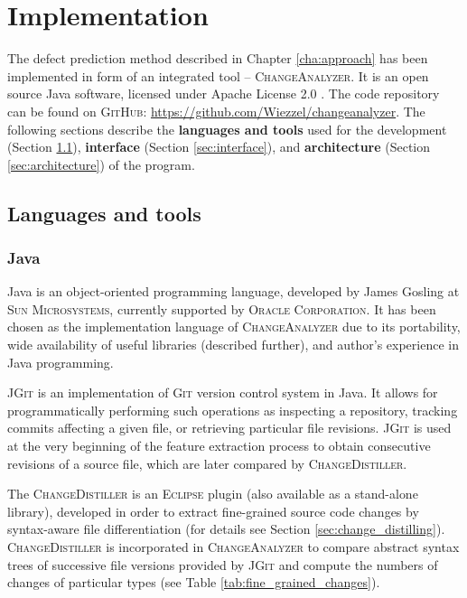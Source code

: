 \documentclass{pracamgr}
\newcommand{\ca}{\textsc{ChangeAnalyzer}\xspace}
\newenvironment{definition}[1]%
	{
		\medskip
		\begin{adjustwidth}{\parindent}{}
		\rlap{\textbf{#1}}\par\nobreak
	}
	{
		\end{adjustwidth}
	}
\begin{document}
\chapter{Implementation}
\label{cha:implementation}
The defect prediction method described in Chapter \ref{cha:approach} has been implemented in form of an integrated tool -- \ca. It is an open source Java software, licensed under Apache License 2.0 \cite{apache}. The code repository can be found on \textsc{GitHub}: \url{https://github.com/Wiezzel/changeanalyzer}. The following sections describe the \textbf{languages and tools} used for the development (Section \ref{sec:languagess}), \textbf{interface} (Section \ref{sec:interface}), and \textbf{architecture} (Section \ref{sec:architecture}) of the program.

\section{Languages and tools}
\label{sec:languagess}

\subsection{Java} 

Java \cite{java} is an object-oriented programming language, developed by James Gosling at \textsc{Sun Microsystems}, currently supported by \textsc{Oracle Corporation}. It has been chosen as the implementation language of \ca due to its portability, wide availability of useful libraries (described further), and author's experience in Java programming.

\begin{definition}{JGit}
\textsc{JGit} \cite{jgit} is an implementation of \textsc{Git} \cite{git} version control system in Java. It allows for programmatically performing such operations as inspecting a repository, tracking commits affecting a given file, or retrieving particular file revisions. \textsc{JGit} is used at the very beginning of the feature extraction process to obtain consecutive revisions of a source file, which are later compared by \textsc{ChangeDistiller}.
\end{definition}

\begin{definition}{ChangeDistiller}
The \textsc{ChangeDistiller} \cite{change_distilling} is an \textsc{Eclipse} plugin (also available as a stand-alone library), developed in order to extract fine-grained source code changes by syntax-aware file differentiation (for details see Section \ref{sec:change_distilling}). \textsc{ChangeDistiller} is incorporated in \ca to compare abstract syntax trees of successive file versions provided by \textsc{JGit} and compute the numbers of changes of particular types (see Table \ref{tab:fine_grained_changes}).
\end{definition}
\end{document}
